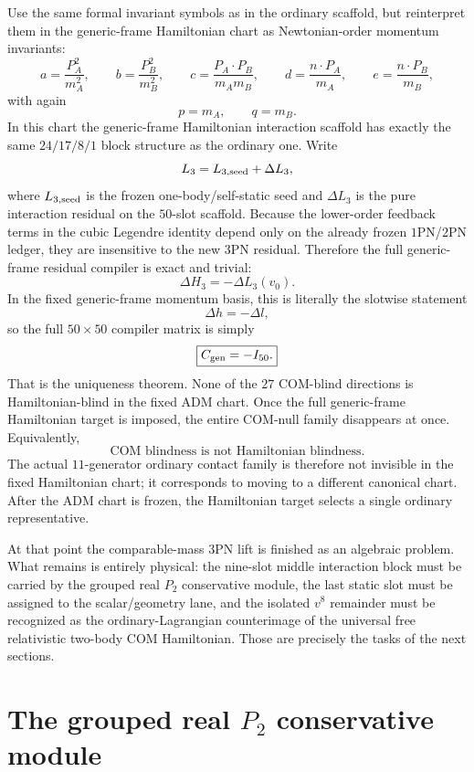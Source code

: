 \documentclass[11pt]{article}
\begin{document}
Use the same formal invariant symbols as in the ordinary scaffold, but reinterpret
them in the generic-frame Hamiltonian chart as Newtonian-order momentum
invariants:
\[
 a=\frac{P_A^2}{m_A^2},
 \qquad
 b=\frac{P_B^2}{m_B^2},
 \qquad
 c=\frac{P_A\!\cdot\!P_B}{m_A m_B},
 \qquad
 d=\frac{n\!\cdot\!P_A}{m_A},
 \qquad
 e=\frac{n\!\cdot\!P_B}{m_B},
\]
with again
\[
 p=m_A,
 \qquad
 q=m_B.
\]
In this chart the generic-frame Hamiltonian interaction scaffold has exactly the
same $24/17/8/1$ block structure as the ordinary one.  Write
\[
L_3=L_{3,\rm seed}+\Delta L_3,
\]
where $L_{3,\rm seed}$ is the frozen one-body/self-static seed and
$\Delta L_3$ is the pure interaction residual on the $50$-slot scaffold.
Because the lower-order feedback terms in the cubic Legendre identity depend only
on the already frozen $1$PN/$2$PN ledger, they are insensitive to the new
$3$PN residual.  Therefore the full generic-frame residual compiler is exact and
trivial:
\[
\boxed{
\Delta H_3=-\Delta L_3(v_0).
}
\]
In the fixed generic-frame momentum basis, this is literally the slotwise
statement
\[
\boxed{\Delta h=-\Delta l,}
\]
so the full $50\times 50$ compiler matrix is simply
\[
\boxed{C_{\rm gen}=-I_{50}.}
\]
That is the uniqueness theorem.  None of the $27$ COM-blind directions is
Hamiltonian-blind in the fixed ADM chart.  Once the full generic-frame
Hamiltonian target is imposed, the entire COM-null family disappears at once.
Equivalently,
\[
\boxed{\text{COM blindness is not Hamiltonian blindness.}}
\]
The actual $11$-generator ordinary contact family is therefore not invisible in
the fixed Hamiltonian chart; it corresponds to moving to a different canonical
chart.  After the ADM chart is frozen, the Hamiltonian target selects a single
ordinary representative.

At that point the comparable-mass $3$PN lift is finished as an algebraic problem.
What remains is entirely physical: the nine-slot middle interaction block must be
carried by the grouped real $P_2$ conservative module, the last static slot must
be assigned to the scalar/geometry lane, and the isolated $v^8$ remainder must be
recognized as the ordinary-Lagrangian counterimage of the universal free
relativistic two-body COM Hamiltonian.  Those are precisely the tasks of the next
sections.


\section{The grouped real \texorpdfstring{$P_2$}{P 2} conservative module}
\label{sec:grouped-p2}
\end{document}

